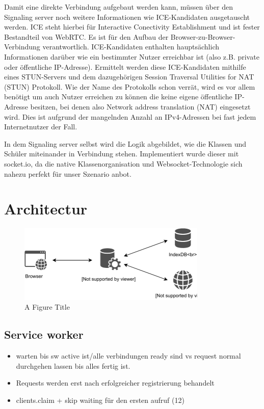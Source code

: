 Damit eine direkte Verbindung aufgebaut werden kann, müssen über den Signaling server noch weitere Informationen wie ICE-Kandidaten ausgetauscht werden. ICE steht hierbei für Interactive Conectivity Establishment und ist fester Bestandteil von WebRTC. Es ist für den Aufbau der Browser-zu-Browser-Verbindung verantwortlich. ICE-Kandidaten enthalten hauptsächlich Informationen darüber wie ein bestimmter Nutzer erreichbar ist (also z.B. private oder öffentliche IP-Adresse). Ermittelt werden diese ICE-Kandidaten mithilfe eines STUN-Servers und dem dazugehörigen Session Traversal Utilities for NAT (STUN) Protokoll. Wie der Name des Protokolls schon verrät, wird es vor allem benötigt um auch Nutzer erreichen zu können die keine eigene öffentliche IP-Adresse besitzen, bei denen also Network address translation (NAT) eingesetzt wird. Dies ist aufgrund der mangelnden Anzahl an IPv4-Adressen bei fast jedem Internetnutzer der Fall.

In dem Signaling server selbst wird die Logik abgebildet, wie die Klassen und Schüler miteinander in Verbindung stehen. Implementiert wurde dieser mit socket.io, da die native Klassenorganisation und Websocket-Technologie sich nahezu perfekt für unser Szenario anbot.

\section{Architectur}

\begin{figure}[!h]
	\centering
	\includegraphics[width=0.8\textwidth]{figures/ServiceWorker}
	\caption[A Figure Short-Title]{A Figure Title}
	\label{fig:sequenceDiagram}
\end{figure}

\subsection{Service worker}
\begin{itemize}
  \item warten bis sw active ist/alle verbindungen ready sind vs request normal durchgehen lassen bis alles fertig ist.
  \item Requests werden erst nach erfolgreicher registrierung behandelt
  \item clients.claim + skip waiting für den ersten aufruf (12)
\end{itemize}


